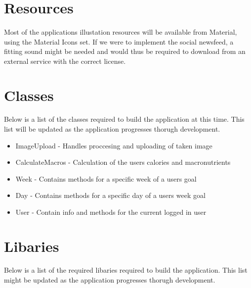\documentclass{article}
\begin{document}
    \newpage

    \section{Resources}
        \paragraph{}
        Most of the applications illustation resources will be available from Material, using the Material Icons set. If we were to implement the social newsfeed,
        a fitting sound might be needed and would thus be required to download from an external service with the correct license.

    \hfill \break

    \section{Classes}
        \paragraph{}
        Below is a list of the classes required to build the application at this time. This list will be updated as the application progresses thorugh development.

        \hfill \break

        \begin{itemize}
            \item ImageUpload       - Handles proccesing and uploading of taken image
            \item CalculateMacros   - Calculation of the users calories and macronutrients
            \item Week              - Contains methods for a specific week of a users goal
            \item Day               - Contains methods for a specific day of a users week goal
            \item User              - Contain info and methods for the current logged in user  
        \end{itemize}

        \hfill \break

    \section{Libaries}
        \paragraph{}
        Below is a list of the required libaries required to build the application. This list might be updated as the application progresses thorugh development.
\end{document}
